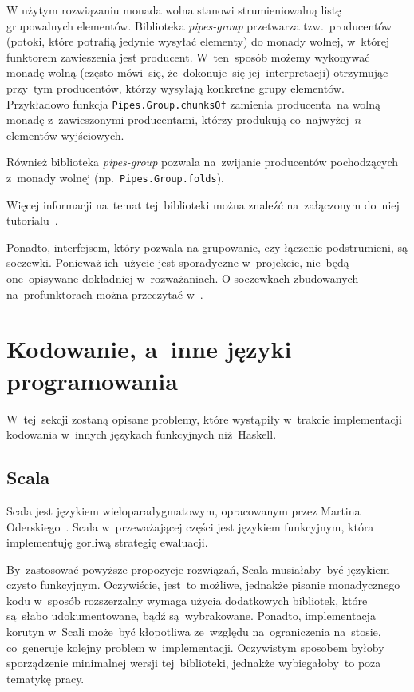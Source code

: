 \documentclass[../../thesis.tex]{subfiles}
\begin{document}
W użytym rozwiązaniu monada wolna stanowi strumieniowalną listę grupowalnych
elementów. Biblioteka \emph{pipes-group} przetwarza tzw.~producentów
(potoki, które potrafią jedynie wysyłać elementy) do monady wolnej,
w~której funktorem zawieszenia jest producent. W~ten~sposób możemy 
wykonywać monadę wolną (często mówi~się, że~dokonuje~się jej~interpretacji)
otrzymując przy~tym producentów, którzy wysyłają konkretne grupy elementów.
Przykładowo funkcja \texttt{Pipes.Group.chunksOf} zamienia producenta~na wolną monadę
z~zawieszonymi producentami, którzy produkują co~najwyżej~\( n \) elementów
wyjściowych.

Również biblioteka \emph{pipes-group} pozwala na~zwijanie producentów
pochodzących z~monady wolnej (np.~\texttt{Pipes.Group.folds}).

Więcej informacji na~temat tej~biblioteki można znaleźć na~załączonym
do~niej tutorialu~\cite{Hackage:Pipes-Groups-Tut}.

Ponadto, interfejsem, który pozwala na grupowanie, czy łączenie podstrumieni,
są soczewki. Ponieważ ich~użycie jest sporadyczne w~projekcie, nie~będą
one~opisywane dokładniej w~rozważaniach. O soczewkach zbudowanych
na~profunktorach można przeczytać w~\cite{Pickering_2017}.

\section{Kodowanie, a~inne języki programowania}

W~tej~sekcji zostaną opisane problemy, które wystąpiły w~trakcie implementacji
kodowania w~innych językach funkcyjnych niż~Haskell. 

\subsection{Scala}

Scala jest językiem wieloparadygmatowym, opracowanym przez Martina Oderskiego~\cite{Odersky:BHS}.
Scala w~przeważającej części jest językiem funkcyjnym, która implementuję gorliwą strategię
ewaluacji.

By~zastosować powyższe propozycje rozwiązań, Scala musiałaby~być językiem czysto funkcyjnym.
Oczywiście, jest~to możliwe, jednakże pisanie monadycznego kodu w~sposób rozszerzalny
wymaga użycia dodatkowych bibliotek, które są~słabo udokumentowane, bądź są~wybrakowane.
Ponadto, implementacja korutyn w~Scali może~być kłopotliwa ze~względu na~ograniczenia
na~stosie, co~generuje kolejny problem w~implementacji. Oczywistym sposobem byłoby
sporządzenie minimalnej wersji tej~biblioteki, jednakże wybiegałoby~to poza tematykę pracy.
\end{document}
